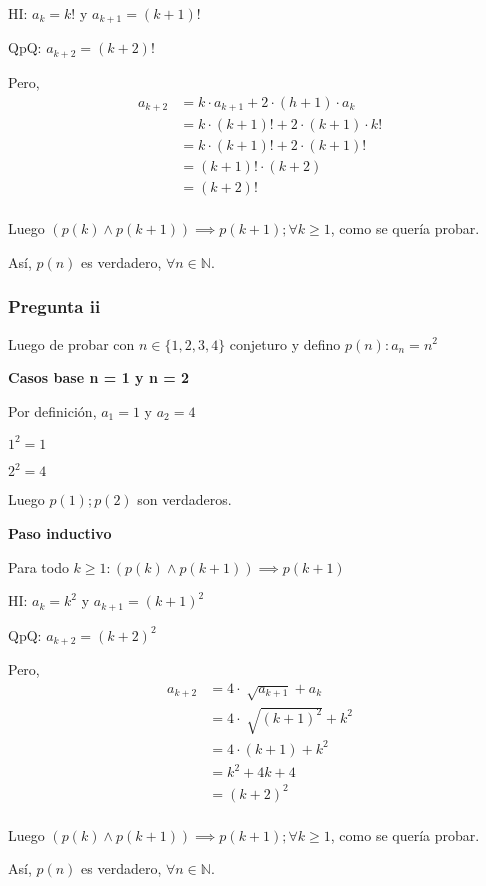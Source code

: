 HI: $ a_k = k! $ y $ a_{k+1} = (k+1)! $

QpQ: $ a_{k+2} = (k+2)!$

Pero,
\begin{align*}
    a_{k+2} &= k \cdot a_{k+1} +2\cdot (h+1) \cdot a_k \\
    &= k \cdot (k+1)! +2\cdot (k+1) \cdot k! \\
    &= k \cdot (k+1)! +2\cdot (k+1)! \\
    &= (k+1)! \cdot (k+2) \\
    &= (k+2)! \\
\end{align*}

Luego $(p(k) \wedge p(k+1)) \implies p(k+1); \forall k \geq 1$, como se quería probar.

Así, $p(n)$ es verdadero, $\forall n \in \mathbb{N}$.

\subsubsection{Pregunta ii}

Luego de probar con $ n \in \{ 1,2,3,4 \} $ conjeturo y defino $ p(n): a_n = n^2 $

\textbf{Casos base n = 1 y n = 2}

Por definición, $a_1 = 1$ y $a_2 = 4$

$ 1^2 = 1$

$ 2^2 = 4 $

Luego $ p(1); p(2) $ son verdaderos.

\textbf{Paso inductivo}

Para todo $k \geq 1: (p(k) \wedge p(k+1)) \implies p(k+1)$

HI: $ a_k = k^2 $ y $ a_{k+1} = (k+1)^2 $

QpQ: $ a_{k+2} = (k+2)^2$

Pero,
\begin{align*}
    a_{k+2} &= 4\cdot \sqrt[]{a_{k+1}} + a_k \\
    &= 4\cdot \sqrt[]{(k+1)^2} + k^2 \\
    &= 4\cdot (k+1) + k^2 \\
    &= k^2 + 4k+ 4 \\
    &= (k+2)^2 \\
\end{align*}

Luego $(p(k) \wedge p(k+1)) \implies p(k+1); \forall k \geq 1$, como se quería probar.

Así, $p(n)$ es verdadero, $\forall n \in \mathbb{N}$.

